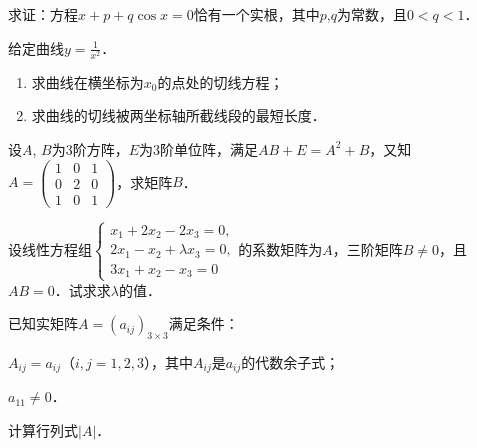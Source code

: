 \documentclass[plain,noanswer,medmath]{../../template/jnuexam}
\begin{document}

\begin{problem}
求证：方程$x + p + q\cos x = 0$恰有一个实根，其中$p$,$q$为常数，且$0 < q < 1$．
\end{problem}



\begin{problem}
给定曲线$y = \frac{1}{x^2}$．
\begin{enumerate}
\item 求曲线在横坐标为$x_0$的点处的切线方程；
\item 求曲线的切线被两坐标轴所截线段的最短长度．
\end{enumerate}
\end{problem}



\begin{problem}
设$A$, $B$为$3$阶方阵，$E$为$3$阶单位阵，满足$AB + E = A^2 + B$，又知$A = \begin{pmatrix}
  1 & 0 & 1 \\
  0 & 2 & 0 \\
  1 & 0 & 1
\end{pmatrix}$，求矩阵$B$．
\end{problem}



\begin{problem}
设线性方程组$\begin{cases}
  x_1 + 2x_2 - 2x_3 = 0, \\
  2x_1 - x_2 + \lambda x_3 = 0, \\
  3x_1 + x_2 - x_3 = 0
\end{cases}$的系数矩阵为$A$，三阶矩阵$B \ne 0$，且$AB = 0$．试求求$\lambda$的值．
\end{problem}



\begin{problem}
已知实矩阵$A = (a_{ij})_{3 \times 3}$满足条件：\par
\begin{enumerate*}
\item $A_{ij} = a_{ij}$（$i,j = 1,2,3$），其中$A_{ij}$是$a_{ij}$的代数余子式；
\item $a_{11} \ne 0$．
\end{enumerate*}\par
计算行列式$|A|$．
\end{problem}






\end{document}
